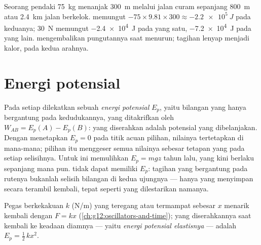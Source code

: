 \begin{example}\label{ex:g12:work-and-energy:trails}
Seorang pendaki \qty{75}{kg} menanjak \qty{300}{m} melalui jalan curam sepanjang
\qty{800}{m} atau \qty{2.4}{km} jalan berkelok.  memungut
$-75 \times 9.81 \times 300 \approx \qty{-2.2e5}{J}$ pada keduanya; 
 \qty{30}{N} memungut \qty{-2.4e4}{J} pada yang satu, \qty{-7.2e4}{J}
pada yang lain.  mengembalikan pungutannya saat menurun; tagihan
 lenyap menjadi kalor, pada kedua arahnya.
\end{example}

\section{Energi potensial}

\begin{definition}\label{def:g12:work-and-energy:ep}
Pada setiap  dilekatkan sebuah
\emph{energi potensial}
$E_p$, yaitu bilangan yang hanya bergantung pada kedudukannya, yang ditakrifkan oleh
$W_{AB} = E_p(A) - E_p(B)$:  yang diserahkan adalah  potensial yang dibelanjakan.
Dengan menetapkan $E_p = 0$ pada titik acuan pilihan, nilainya tertetapkan di mana-mana;
pilihan itu menggeser semua nilainya sebesar tetapan yang  pada setiap
selisihnya. Untuk  ini memulihkan $E_p = mgz$ tahun lalu,
yang kini berlaku sepanjang  mana pun.  tidak dapat memiliki $E_p$: tagihan
yang bergantung pada rutenya bukanlah selisih bilangan di kedua ujungnya --- hanya  yang menyimpan secara terambil kembali, tepat seperti yang dilestarikan namanya.
\end{definition}

\begin{proposition}\label{prop:g12:work-and-energy:elastic}
Pegas berkekakuan $k$ (\unit{N/m}) yang teregang atau termampat sebesar $x$
menarik kembali dengan  $F = kx$
(\cref{ch:g12:oscillators-and-time});  yang diserahkannya saat kembali
ke keadaan diamnya --- yaitu
\emph{energi potensial elastisnya} --- adalah
$E_p = \tfrac12\, k x^2$.
\end{proposition}

